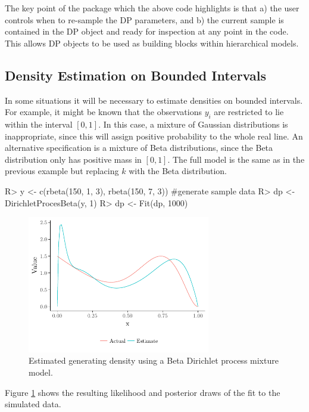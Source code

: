 \documentclass[nojss]{jss}
\begin{document}
The key point of the   package which the above code highlights is that a) the user controls when to re-sample the DP parameters, and b) the current sample is contained in the DP object and ready for inspection at any point in the code. This allows DP objects to be used as building blocks within hierarchical models.

\subsection{Density Estimation on Bounded Intervals}
In some situations it will be necessary to estimate densities on bounded intervals. For example, it might be known that the observations $y_i$ are restricted to lie within the interval $[0,1]$. In this case, a mixture of Gaussian distributions is inappropriate, since this will assign positive probability to the whole real line. An alternative specification is a mixture of Beta distributions, since the Beta distribution only has positive mass in $[0,1]$. The full model is the same as in the previous example but replacing $k$ with the Beta distribution.

\begin{Schunk}
\begin{Sinput}
R> y <- c(rbeta(150, 1, 3), rbeta(150, 7, 3)) #generate sample data
R> dp <- DirichletProcesBeta(y, 1)
R> dp <- Fit(dp, 1000)
\end{Sinput}
\end{Schunk}

\begin{figure}[tb]
	\centering
	\includegraphics[height=60mm, width=80mm]{img/density_bounded_plot.pdf}
	\caption{Estimated generating density using a Beta Dirichlet process mixture model.}
	\label{fig:densitybounded}
\end{figure}
Figure \ref{fig:densitybounded} shows the resulting likelihood and posterior draws of the fit to the simulated data.
\end{document}
